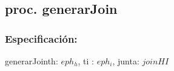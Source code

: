 \subsection{proc. generarJoin}
    \subsubsection{Especificaci\'on:}
        \begin{proc}{generarJoin}{\In th: $eph_{h}$, \In ti : $eph_{i}$, \Out junta:  $joinHI$}{}
        \end{proc}
